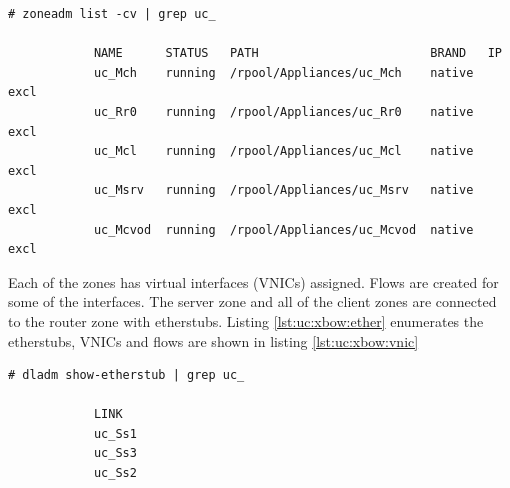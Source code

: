 \documentclass[11pt]{book}
\begin{document}
        \noindent
        \begin{minipage}{\textwidth}
          \begin{lstlisting}[caption={All the zones created after model instantiation},label={lst:uc:xbow:zone}]
            # zoneadm list -cv | grep uc_

            NAME      STATUS   PATH                        BRAND   IP    
            uc_Mch    running  /rpool/Appliances/uc_Mch    native  excl
            uc_Rr0    running  /rpool/Appliances/uc_Rr0    native  excl
            uc_Mcl    running  /rpool/Appliances/uc_Mcl    native  excl
            uc_Msrv   running  /rpool/Appliances/uc_Msrv   native  excl
            uc_Mcvod  running  /rpool/Appliances/uc_Mcvod  native  excl
          \end{lstlisting}
        \end{minipage}

        Each of the zones has virtual interfaces (VNICs) assigned. Flows are created for some of the interfaces. The
        server zone and all of the client zones are connected to the router zone with etherstubs. Listing
        \ref{lst:uc:xbow:ether} enumerates the etherstubs, VNICs and flows are shown in listing \ref{lst:uc:xbow:vnic} \\

        \noindent
        \begin{minipage}{\textwidth}
          \begin{lstlisting}[caption={Etherstubs},label={lst:uc:xbow:ether}]
            # dladm show-etherstub | grep uc_

            LINK
            uc_Ss1
            uc_Ss3
            uc_Ss2
          \end{lstlisting}
        \end{minipage}
\end{document}
